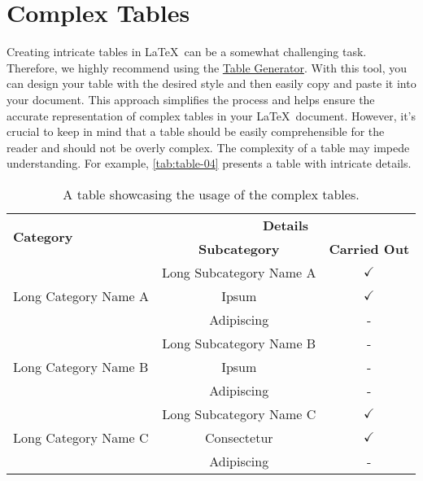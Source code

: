 \section{Complex Tables}
Creating intricate tables in \LaTeX\ can be a somewhat challenging task. Therefore, we highly recommend using the \href{https://www.tablesgenerator.com/}{Table Generator}. With this tool, you can design your table with the desired style and then easily copy and paste it into your document. This approach simplifies the process and helps ensure the accurate representation of complex tables in your \LaTeX\ document. However, it's crucial to keep in mind that a table should be easily comprehensible for the reader and should not be overly complex. The complexity of a table may impede understanding. For example, \autoref{tab:table-04} presents a table with intricate details.

\begin{table}[!htpb]
    \caption{A table showcasing the usage of the complex tables.}
    \label{tab:table-04}
    \centering
    \begin{tabular}{lcc}
        \toprule
        \multirow{2}{*}{\textbf{Category}} & \multicolumn{2}{c}{\textbf{Details}} \\
        \cmidrule(lr){2-3}
        & \textbf{Subcategory} & \textbf{Carried Out} \\
        \midrule
        \multirow{3}{*}{Long Category Name A} & Long Subcategory Name A & $\checkmark$ \\
        & Ipsum & $\checkmark$ \\
        & Adipiscing & - \\
        \midrule
        \multirow{3}{*}{Long Category Name B} & Long Subcategory Name B & - \\
        & Ipsum & - \\
        & Adipiscing & - \\
        \midrule
        \multirow{3}{*}{Long Category Name C} & Long Subcategory Name C & $\checkmark$ \\
        & Consectetur & $\checkmark$ \\
        & Adipiscing & - \\
        \bottomrule
    \end{tabular}
\end{table}